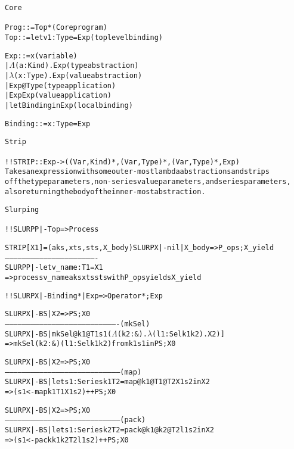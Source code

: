 \begin{alltt}
Core 
~~~~
   Prog    ::= Top*                                (Core program)
   Top     ::= let v1 : Type = Exp                 (top level binding)

   Exp     ::= x                                   (variable)
            |  \(\Lambda\)(a : Kind). Exp                    (type abstraction)
            |  \(\lambda\)(x : Type). Exp                    (value abstraction)
            |  Exp @Type                           (type application)
            |  Exp  Exp                            (value application)
            |  let Binding in Exp                  (local binding)   
                     
   Binding ::=  x : Type = Exp

Strip 
~~~~~
 !! STRIP   :: Exp -> ((Var, Kind)*, (Var, Type)*, (Var, Type)*,  Exp)
    Takes an expression with some outer-most lambda abstractions and strips
    off the type parameters, non-series value parameters, and series parameters,
    also returning the body of the inner-most abstraction.

Slurping
~~~~~~~~
 !!  SLURPP|- Top => Process

     STRIP[ X1 ] = (aks, xts, sts, X_body)   SLURPX|- nil | X_body => P_ops ; X_yield
   ----------------------------------------------------------------
     SLURPP|- let v_name : T1 = X1  
           => process  v_name aks xts sts  with  P_ops  yields  X_yield


 !!  SLURPX|- Binding* | Exp => Operator* ; Exp

     SLURPX|- BS | X2 => PS ; X0
   ------------------------------------------------------------------------------- (mkSel)
     SLURPX|- BS | mkSel @k1 @T1 s1 (\(\Lambda\)(k2 : &). \(\lambda\)(l1 : Sel k1 k2). X2) ]
           => mkSel (k2 : &) (l1 : Sel k1 k2) from  k1 s1 in PS            ; X0

     SLURPX|- BS | X2 => PS ; X0
   -------------------------------------------------------------------------------- (map)
     SLURPX|- BS | let s1 : Series k1 T2 = map  @k1 @T1 @T2 X1 s2     in X2
           =>                       (s1 <- map   k1  T1    X1 s2)    ++ PS ; X0

     SLURPX|- BS | X2 => PS ; X0
   -------------------------------------------------------------------------------- (pack)
     SLURPX|- BS | let s1 : Series k2 T2 = pack @k1 @k2 @T2 l1 s2    in X2
           =>                       (s1 <- pack  k1  k2  T2 l1 s2)   ++ PS ; X0


\end{alltt}
